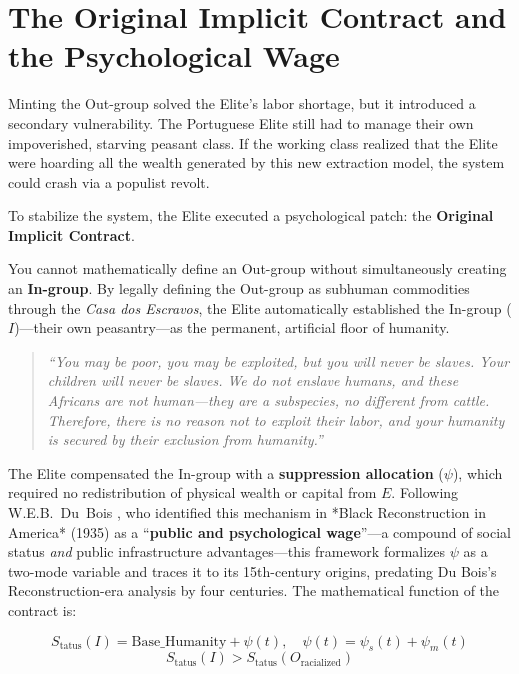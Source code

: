 \section{The Original Implicit Contract and the Psychological Wage}
\label{sec:dubois_wage}

Minting the Out-group solved the Elite's labor shortage, but it introduced a secondary vulnerability. The Portuguese Elite still had to manage their own impoverished, starving peasant class. If the working class realized that the Elite were hoarding all the wealth generated by this new extraction model, the system could crash via a populist revolt.

To stabilize the system, the Elite executed a psychological patch: the \textbf{Original Implicit Contract}.

You cannot mathematically define an Out-group without simultaneously creating an \textbf{In-group}. By legally defining the Out-group as subhuman commodities through the \textit{Casa dos Escravos}, the Elite automatically established the In-group ($I$)---their own peasantry---as the permanent, artificial floor of humanity.

\begin{quote}
\textit{``You may be poor, you may be exploited, but you will never be slaves. Your children will never be slaves. We do not enslave humans, and these Africans are not human---they are a subspecies, no different from cattle. Therefore, there is no reason not to exploit their labor, and your humanity is secured by their exclusion from humanity.''}
\end{quote}

The Elite compensated the In-group with a \textbf{suppression allocation} ($\psi$), which required no redistribution of physical wealth or capital from $E$. Following W.E.B.\ Du~Bois \cite{dubois}, who identified this mechanism in *Black Reconstruction in America* (1935) as a ``\textbf{public and psychological wage}''---a compound of social status \textit{and} public infrastructure advantages---this framework formalizes $\psi$ as a two-mode variable and traces it to its 15th-century origins, predating Du Bois's Reconstruction-era analysis by four centuries. The mathematical function of the contract is:

\begin{equation}\label{eq:2.2-status-suppression-allocation}
S_{\text{tatus}}(I) = \text{Base\_Humanity} + \psi(t), \quad \psi(t) = \psi_s(t) + \psi_m(t)
\end{equation}
\begin{equation}\label{eq:2.3-psi-null-in-survival}
S_{\text{tatus}}(I) > S_{\text{tatus}}(O_{\text{racialized}})
\end{equation}

